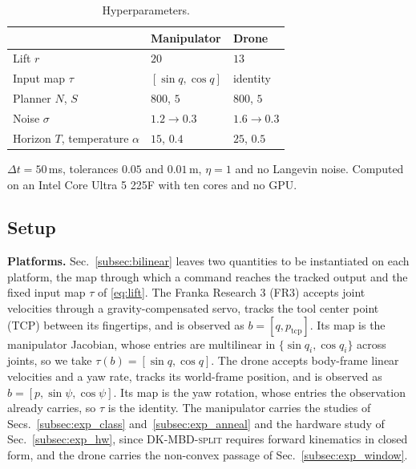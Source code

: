 \documentclass[letterpaper,10pt,conference]{ieeeconf}
\newcommand{\dksplit}{\textsc{DK-MBD-split}}
\begin{document}
\begin{table}[t]
\centering
\begin{threeparttable}
\caption{Hyperparameters.}
\label{tab:hyper}
\footnotesize
\begin{tabularx}{\linewidth}{l Y Y}
\toprule
& Manipulator & Drone \\
\midrule
Lift $r$ & $20$ & $13$ \\
Input map $\tau$ & $[\sin q, \cos q]$ & identity \\
Planner $N$, $S$ & $800$, $5$ & $800$, $5$ \\
Noise $\sigma$ & $1.2 \to 0.3$ & $1.6 \to 0.3$ \\
Horizon $T$, temperature $\alpha$ & $15$, $0.4$ & $25$, $0.5$ \\
\bottomrule
\end{tabularx}
\begin{tablenotes}[flushleft]\scriptsize
\item $\Delta t = 50$\,ms, tolerances $0.05$ and $0.01$\,m, $\eta = 1$ and no Langevin noise.
Computed on an Intel Core Ultra 5 225F with ten cores and no GPU.
\end{tablenotes}
\end{threeparttable}
\end{table}

\subsection{Setup}\label{subsec:setup}

\textbf{Platforms.}
Sec.~\ref{subsec:bilinear} leaves two quantities to be instantiated on each platform, the map through which a command reaches the tracked output and the fixed input map $\tau$ of \eqref{eq:lift}.
The Franka Research 3 (FR3) accepts joint velocities through a gravity-compensated servo, tracks the tool center point (TCP) between its fingertips, and is observed as $b = [q, p_{\mathrm{tcp}}]$.
Its map is the manipulator Jacobian, whose entries are multilinear in $\{\sin q_i, \cos q_i\}$ across joints, so we take $\tau(b) = [\sin q, \cos q]$.
The drone accepts body-frame linear velocities and a yaw rate, tracks its world-frame position, and is observed as $b = [p, \sin\psi, \cos\psi]$.
Its map is the yaw rotation, whose entries the observation already carries, so $\tau$ is the identity.
The manipulator carries the studies of Secs.~\ref{subsec:exp_class} and~\ref{subsec:exp_anneal} and the hardware study of Sec.~\ref{subsec:exp_hw}, since \dksplit{} requires forward kinematics in closed form, and the drone carries the non-convex passage of Sec.~\ref{subsec:exp_window}.
\end{document}

